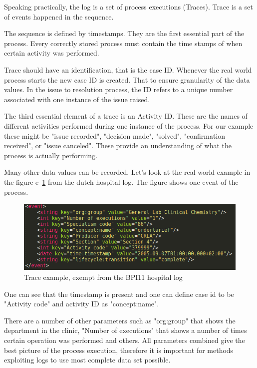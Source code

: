 Speaking practically, the log is a set of process executions (Traces). Trace is a set of events happened in the sequence.

The sequence is defined by timestamps. They are the first essential part of the process. Every correctly stored process must contain the time stamps of when certain activity was performed. 

Trace should have an identification, that is the case ID. Whenever the real world process starts the new case ID is created. That to ensure granularity of the data values. In the issue to resolution process, the ID refers to a unique number associated with one instance of the issue raised. 

The third essential element of a trace is an Activity ID. These are the names of different activities performed during one instance of the process. For our example these might be "issue recorded", "decision made", "solved", "confirmation received", or "issue canceled". These provide an understanding of what the process is actually performing. 

Many other data values can be recorded. Let's look at the real world example in the figure e~\ref{figure:trace-example-1} from the dutch hospital log. The figure shows one event of the process. 

\begin{figure}[!ht]
	\begin{center}  
		\includegraphics[width=\textwidth]{3_event_example.png}
		\caption{Trace example, exempt from the BPI11 hospital log~\cite{bpichallenge2011}}
		\label{figure:trace-example-1}	
	\end{center}
\end{figure}

One can see that the timestamp is present and one can define case id to be "Activity code" and activity ID as "concept:name".

There are a number of other parameters such as "org:group" that shows the department in the clinic, "Number of executions" that shows a number of times certain operation was performed and others.  All parameters combined give the best picture of the process execution, therefore it is important for methods exploiting logs to use most complete data set possible.

